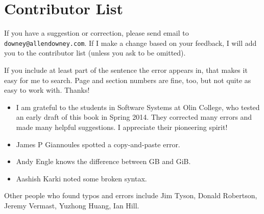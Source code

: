 \documentclass[12pt]{book}
\begin{document}
\section*{Contributor List}


If you have a suggestion or correction, please send email to 
{\tt downey@allendowney.com}.  If I make a change based on your
feedback, I will add you to the contributor list
(unless you ask to be omitted).

If you include at least part of the sentence the
error appears in, that makes it easy for me to search.  Page and
section numbers are fine, too, but not quite as easy to work with.
Thanks!

\small

\begin{itemize}

\item I am grateful to the students in Software Systems at Olin
College, who tested an early draft of this book in Spring 2014.
They corrected many errors and made many helpful suggestions.
I appreciate their pioneering spirit!

\item James P Giannoules spotted a copy-and-paste error.

\item Andy Engle knows the difference between GB and GiB.

\item Aashish Karki noted some broken syntax.


\end{itemize}

Other people who found typos and errors include
Jim Tyson, Donald Robertson, Jeremy Vermast, Yuzhong Huang, Ian Hill.

\normalsize

\clearemptydoublepage


\tableofcontents

\clearemptydoublepage
\end{document}
